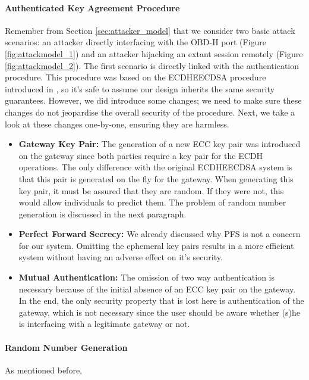 \paragraph{Authenticated Key Agreement Procedure}
Remember from Section \ref{sec:attacker_model} that we consider two basic attack scenarios: an attacker directly interfacing with the OBD-II port (Figure \ref{fig:attackmodel_1}) and an attacker hijacking an extant session remotely (Figure \ref{fig:attackmodel_2}). The first scenario is directly linked with the authentication procedure. This procedure was based on the ECDHE\textunderscore ECDSA procedure introduced in \cite{RFC4492}, so it's safe to assume our design inherits the same security guarantees. However, we did introduce some changes; we need to make sure these changes do not jeopardise the overall security of the procedure. Next, we take a look at these changes one-by-one, ensuring they are harmless.
\begin{itemize}
	\item \textbf{Gateway Key Pair:} The generation of a new ECC key pair was introduced on the gateway since both parties require a key pair for the ECDH operations. The only difference with the original ECDHE\textunderscore ECDSA system is that this pair is generated on the fly for the gateway. When generating this key pair, it must be assured that they are random. If they were not, this would allow individuals to predict them. The problem of random number generation is discussed in the next paragraph.
	
	\item \textbf{Perfect Forward Secrecy:} We already discussed why PFS is not a concern for our system. Omitting the ephemeral key pairs results in a more efficient system without having an adverse effect on it's security.
	
	\item \textbf{Mutual Authentication:} The omission of two way authentication is necessary because of the initial absence of an ECC key pair on the gateway. In the end, the only security property that is lost here is authentication of the gateway, which is not necessary since the user should be aware whether (s)he is interfacing with a legitimate gateway or not.
\end{itemize} 

\paragraph{Random Number Generation} As mentioned before, 

